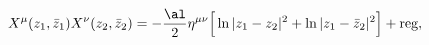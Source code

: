 \begin{equation}
X^\mu(z_1,\bar z_1)X^\nu(z_2,\bar z_2)=
-\frac{\al}{2}\eta^{\mu\nu}\Big[\ln |z_1-z_2|^2
+\ln |z_1-\bar z_2|^2\Big]+\mbox{reg},\label{Neumann OPE}
\end{equation}


